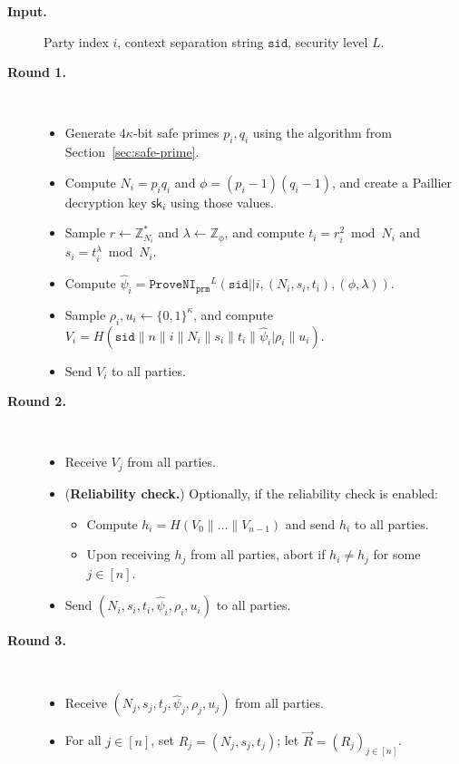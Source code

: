 \documentclass[11pt]{article}
\newcommand{\sid}{\ensuremath{\mathtt{sid}}}
\newcommand{\proveni}[1]{\ensuremath{\mathtt{ProveNI}_{\mathtt{#1}}}}
\newcommand{\sk}{\textsf{sk}}
\newcommand{\Z}{\mathbb{Z}}
\newcommand{\?}[1]{\stackrel{?}{#1}}
\begin{document}
\begin{description}
  \item[\textbf{Input.}]
    Party index $i$,
    context separation string $\sid$,
    security level $L$.

  \item[\textbf{Round 1.}] \
    \begin{itemize}
    \item Generate $4\kappa$-bit safe primes $p_i, q_i$ using the algorithm from Section~\ref{sec:safe-prime}.
      \item Compute $N_i = p_iq_i$ and $\phi = (p_i - 1)(q_i - 1)$, and create a Paillier decryption key $\sk_i$ using those values.
     \item Sample  $r \gets \Z_{N_i}^{*}$ and $\lambda \gets \Z_\phi$,
        and compute $t_i = r_i^2 \bmod N_i$ and $s_i = t_i^\lambda \bmod N_i$.
      \item Compute $\hat{\psi}_i = \proveni{prm}^L(\sid||i, (N_i, s_i, t_i), (\phi, \lambda))$.
      \item Sample $\rho_i, u_i \leftarrow \{0,1\}^\kappa$, 
        and compute $V_i =
        H(\sid\| n\| i\| N_i\|s_i\| t_i\| \hat{\psi}_i|\rho_i\| u_i)$.
      \item Send $V_i$ to all parties.
    \end{itemize}
    

  \item[\textbf{Round 2.}] \
    \begin{itemize}
      \item Receive $V_j$ from all parties.
      \item ({\bf Reliability check.}) Optionally, if the reliability check is enabled:
    \begin{itemize}
        \item 
        Compute $h_i = H(V_0 \| \dots \| V_{n-1})$ and 
            send $h_i$ to all parties.
        
        
        \item Upon receiving $h_j$ from all parties, abort if $h_i \neq h_j$ for some $j \in [n]$.
    \end{itemize}
      \item Send $(N_i, s_i, t_i, \hat{\psi}_i, \rho_i, u_i)$ to all parties.
    \end{itemize}

  \item[\textbf{Round 3.}] \

    \begin{itemize}
      \item Receive $(N_j, s_j, t_j, \hat{\psi}_j, \rho_j, u_j)$
        from all parties.
      \item For all $j \in [n]$, set $R_j = (N_j, s_j, t_j)$; let
       $\vec{R} = (R_j)_{j \in [n]}$.


\end{itemize}
\end{description}
\end{document}
